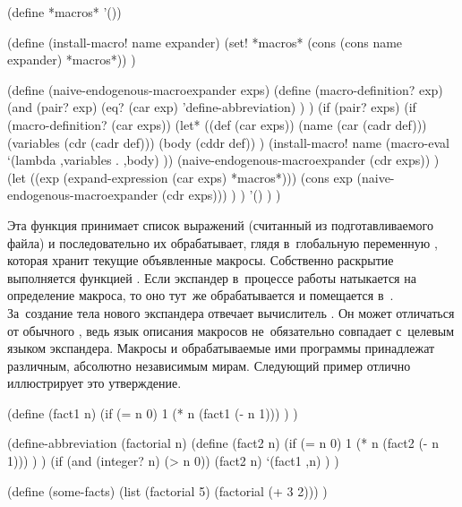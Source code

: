 \begin{code:lisp}
(define *macros* '())

(define (install-macro! name expander)
  (set! *macros* (cons (cons name expander) *macros*)) )

(define (naive-endogenous-macroexpander exps)
  (define (macro-definition? exp)
    (and (pair? exp)
         (eq? (car exp) 'define-abbreviation) ) )
  (if (pair? exps)
      (if (macro-definition? (car exps))
          (let* ((def       (car exps))
                 (name      (car (cadr def)))
                 (variables (cdr (cadr def)))
                 (body      (cddr def)) )
            (install-macro! name (macro-eval
                                  `(lambda ,variables . ,body) ))
            (naive-endogenous-macroexpander (cdr exps)) )
          (let ((exp (expand-expression (car exps) *macros*)))
            (cons exp (naive-endogenous-macroexpander (cdr exps))) ) )
      '() ) )
\end{code:lisp}

Эта функция принимает список выражений (считанный из подготавливаемого файла) и
последовательно их обрабатывает, глядя в~глобальную переменную ,
которая хранит текущие объявленные макросы. Собственно раскрытие выполняется
функцией . Если экспандер в~процессе работы натыкается на
определение макроса, то оно тут~же обрабатывается и помещается в~.
За~создание тела нового экспандера отвечает вычислитель . Он
может отличаться от обычного , ведь язык описания макросов
не~обязательно совпадает с~целевым языком экспандера. Макросы и обрабатываемые
ими программы принадлежат различным, абсолютно независимым мирам. Следующий
пример отлично иллюстрирует это утверждение.


\begin{code:lisp-framed}[title={\snippet{si/chap9b.scm}},label={src:chap9b.scm}]
(define (fact1 n)
  (if (= n 0) 1
      (* n (fact1 (- n 1))) ) )

(define-abbreviation (factorial n)
  (define (fact2 n)
    (if (= n 0) 1
        (* n (fact2 (- n 1))) ) )
  (if (and (integer? n) (> n 0))
      (fact2 n)
      `(fact1 ,n) ) )

(define (some-facts)
  (list (factorial 5) (factorial (+ 3 2))) )
\end{code:lisp-framed}

